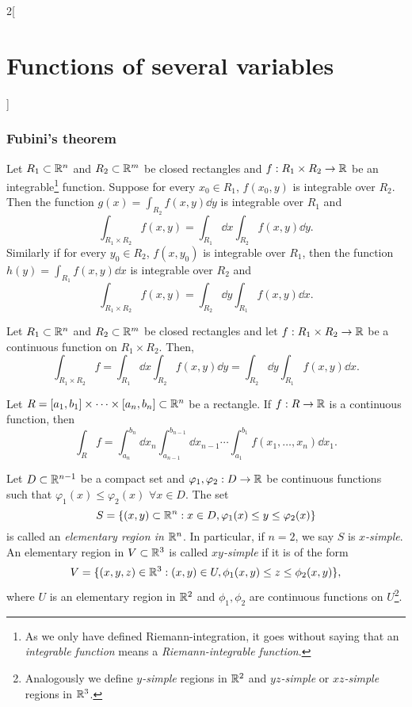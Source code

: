 \documentclass[../../../main.tex]{subfiles}
\begin{document}
\begin{multicols}{2}[\section{Functions of several variables}]
    \subsubsection*{Fubini's theorem}
    \begin{theorem}
        Let $R_1\subset\mathbb{R}^n$ and $R_2\subset\mathbb{R}^m$ be closed rectangles and $f:R_1\times R_2\rightarrow\mathbb{R} $ be an integrable\footnote{As we only have defined Riemann-integration, it goes without saying that an \textit{integrable function} means a \textit{Riemann-integrable function}.} function. Suppose for every $x_0\in R_1$, $f(x_0,y)$ is integrable over $R_2$. Then the function $\displaystyle g(x)=\int_{R_2}f(x,y)\dd y$ is integrable over $R_1$ and $$\int_{R_1\times R_2}f(x,y)=\int_{R_1}\dd x\int_{R_2}f(x,y)\dd y.$$ Similarly if for every $y_0\in R_2$, $f(x,y_0)$ is integrable over $R_1$, then the function $\displaystyle h(y)=\int_{R_1}f(x,y)\dd x$ is integrable over $R_2$ and $$\int_{R_1\times R_2}f(x,y)=\int_{R_2}\dd y\int_{R_1}f(x,y)\dd x.$$
        \begin{corollary}
            Let $R_1\subset\mathbb{R}^n$ and $R_2\subset\mathbb{R}^m$ be closed rectangles and let $f:R_1\times R_2\rightarrow\mathbb{R} $ be a continuous function on $R_1\times R_2$. Then, $$\int_{R_1\times R_2}f=\int_{R_1}\dd x\int_{R_2}f(x,y)\dd y=\int_{R_2}\dd y\int_{R_1}f(x,y)\dd x.$$
        \end{corollary}
        \begin{corollary}
            Let $R=[a_1,b_1]\times\cdots\times[a_n,b_n]\subset\mathbb{R}^n$ be a rectangle. If $f:R\rightarrow\mathbb{R} $ is a continuous function, then $$\int_Rf=\int_{a_n}^{b_n}\dd x_n\int_{a_{n-1}}^{b_{n-1}}\dd x_{n-1}\cdots\int_{a_1}^{b_1}f(x_1,\ldots,x_n)\dd x_1.$$
        \end{corollary}
        \begin{definition}
            Let $D\subset\mathbb{R}^{n-1}$ be a compact set and $\varphi_1,\varphi_2:D\rightarrow\mathbb{R} $ be continuous functions such that $\varphi_1(x)\leq\varphi_2(x)$ $\forall x\in D$. The set $$S=\{(x,y)\subset\mathbb{R}^n:x\in D, \varphi_1(x)\leq y\leq\varphi_2(x)\}$$ is called an \textit{elementary region in $\mathbb{R}^n$}. In particular, if $n=2$, we say $S$ is \textit{$x$-simple}. An elementary region in $V\subset\mathbb{R}^3$ is called \textit{$xy$-simple} if it is of the form $$V=\{(x,y,z)\in\mathbb{R}^3:(x,y)\in U, \phi_1(x,y)\leq z\leq\phi_2(x,y)\},$$ where $U$ is an elementary region in $\mathbb{R}^2$ and $\phi_1,\phi_2$ are continuous functions on $U$\footnote{Analogously we define \textit{$y$-simple} regions in $\mathbb{R}^2$ and \textit{$yz$-simple} or \textit{$xz$-simple} regions in $\mathbb{R}^3$.}.

\end{definition}
\end{theorem}
\end{multicols}
\end{document}

